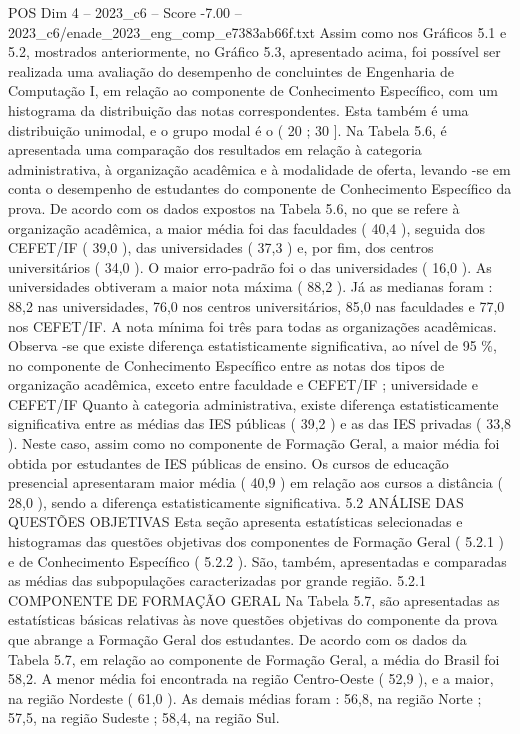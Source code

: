 \begin{textsample}{POS Dim 4 – 2023\_c6 – Score -7.00 – 2023\_c6/enade\_2023\_eng\_comp\_e7383ab66f.txt}
Assim como nos Gráficos 5.1 e 5.2, mostrados anteriormente, no Gráfico 5.3, apresentado acima, foi possível ser realizada uma avaliação do desempenho de concluintes de Engenharia de Computação I, em relação ao componente de Conhecimento Específico, com um histograma da distribuição das notas correspondentes.
Esta também é uma distribuição unimodal, e o grupo modal é o ( 20 ; 30 ].
Na Tabela 5.6, é apresentada uma comparação dos resultados em relação à categoria administrativa, à organização acadêmica e à modalidade de oferta, levando -se em conta o desempenho de estudantes do componente de Conhecimento Específico da prova.
De acordo com os dados expostos na Tabela 5.6, no que se refere à organização acadêmica, a maior média foi das faculdades ( 40,4 ), seguida dos CEFET/IF ( 39,0 ), das universidades ( 37,3 ) e, por fim, dos centros universitários ( 34,0 ).
O maior erro-padrão foi o das universidades ( 16,0 ).
As universidades obtiveram a maior nota máxima ( 88,2 ).
Já as medianas foram : 88,2 nas universidades, 76,0 nos centros universitários, 85,0 nas faculdades e 77,0 nos CEFET/IF.
A nota mínima foi três para todas as organizações acadêmicas.
Observa -se que existe diferença estatisticamente significativa, ao nível de 95 \%, no componente de Conhecimento Específico entre as notas dos tipos de organização acadêmica, exceto entre faculdade e CEFET/IF ; universidade e CEFET/IF Quanto à categoria administrativa, existe diferença estatisticamente significativa entre as médias das IES públicas ( 39,2 ) e as das IES privadas ( 33,8 ).
Neste caso, assim como no componente de Formação Geral, a maior média foi obtida por estudantes de IES públicas de ensino.
Os cursos de educação presencial apresentaram maior média ( 40,9 ) em relação aos cursos a distância ( 28,0 ), sendo a diferença estatisticamente significativa. 5.2 ANÁLISE DAS QUESTÕES OBJETIVAS Esta seção apresenta estatísticas selecionadas e histogramas das questões objetivas dos componentes de Formação Geral ( 5.2.1 ) e de Conhecimento Específico ( 5.2.2 ).
São, também, apresentadas e comparadas as médias das subpopulações caracterizadas por grande região. 5.2.1 COMPONENTE DE FORMAÇÃO GERAL Na Tabela 5.7, são apresentadas as estatísticas básicas relativas às nove questões objetivas do componente da prova que abrange a Formação Geral dos estudantes.
De acordo com os dados da Tabela 5.7, em relação ao componente de Formação Geral, a média do Brasil foi 58,2.
A menor média foi encontrada na região Centro-Oeste ( 52,9 ), e a maior, na região Nordeste ( 61,0 ).
As demais médias foram : 56,8, na região Norte ; 57,5, na região Sudeste ; 58,4, na região Sul.

\end{textsample}
